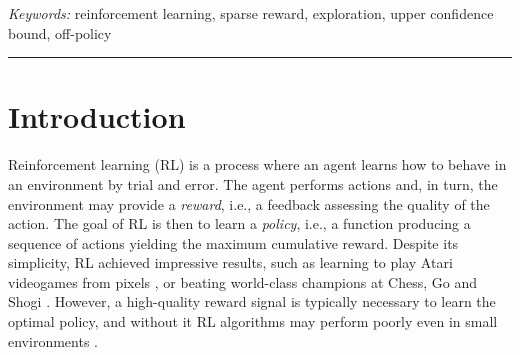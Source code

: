 \documentclass{article}
\begin{document}
\bigskip
\noindent\emph{Keywords:} reinforcement learning, sparse reward, exploration, upper confidence bound, off-policy
\bigskip
\hrule


\section{Introduction}
\label{sec:intro}
Reinforcement learning (RL) is a process where an agent learns how to behave in an environment by trial and error. The agent performs actions and, in turn, the environment may provide a \textit{reward}, i.e., a feedback assessing the quality of the action. The goal of RL is then to learn a \textit{policy}, i.e., a function producing a sequence of actions yielding the maximum cumulative reward.
Despite its simplicity, RL achieved impressive results, such as learning to play Atari videogames from pixels \citep{mnih2013playing,schulman2017proximal}, or beating world-class champions at Chess, Go and Shogi \citep{silver2017amastering}. However, a high-quality reward signal is typically necessary to learn the optimal policy, and without it RL algorithms may perform poorly even in small environments \citep{osband2019deep}.

\clearpage
\end{document}

